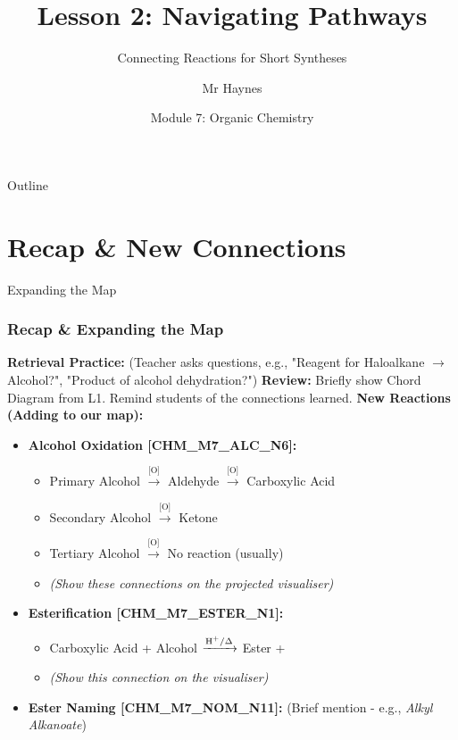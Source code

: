 \documentclass[xcolor=svgnames]{beamer}
\title[Org Chem: Navigating Pathways]{Lesson 2: Navigating Pathways}
\subtitle{Connecting Reactions for Short Syntheses}
\author[P. Haynes]{Mr Haynes} %
\institute[GHS]{Gosford High School}
\date{Module 7: Organic Chemistry}
\begin{document}
\begin{frame}
    \titlepage
\end{frame}

\begin{frame}{Outline}
    \tableofcontents
\end{frame}

\section{Recap \& New Connections}
\begin{frame}{Expanding the Map}
    \frametitle{Recap \& Expanding the Map}
    \textbf{Retrieval Practice:} (Teacher asks questions, e.g., "Reagent for Haloalkane $\rightarrow$ Alcohol?", "Product of alcohol dehydration?")
    \vspace{1em}
    \textbf{Review:} Briefly show Chord Diagram from L1. Remind students of the connections learned.
    \vspace{1em}
    \textbf{New Reactions (Adding to our map):}
    \begin{itemize}
        \item \textbf{Alcohol Oxidation [CHM\_M7\_ALC\_N6]:}
            \begin{itemize}
                \item Primary Alcohol $\xrightarrow{\text{[O]}}$ Aldehyde $\xrightarrow{\text{[O]}}$ Carboxylic Acid
                \item Secondary Alcohol $\xrightarrow{\text{[O]}}$ Ketone
                \item Tertiary Alcohol $\xrightarrow{\text{[O]}}$ No reaction (usually)
                \item \textit{(Show these connections on the projected visualiser)}
            \end{itemize}
        \item \textbf{Esterification [CHM\_M7\_ESTER\_N1]:}
            \begin{itemize}
                \item Carboxylic Acid + Alcohol $\xrightarrow{\ce{H+}/\Delta}$ Ester + 
                \item \textit{(Show this connection on the visualiser)}
            \end{itemize}
        \item \textbf{Ester Naming [CHM\_M7\_NOM\_N11]:} (Brief mention - e.g., \textit{Alkyl Alkanoate})
    \end{itemize}
\end{frame}
\end{document}
